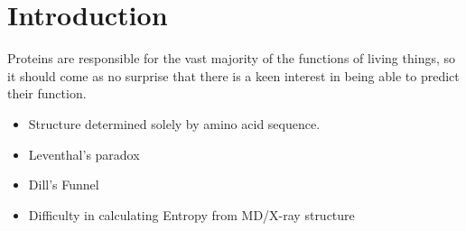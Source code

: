 \section*{Introduction}
\label{sec:introduction}
Proteins are responsible for the vast majority of the functions of living things, so it should come as no surprise that there is a keen interest in being able to predict their function\cite{Dill:2008p283}.
\begin{itemize}
	\item Structure determined solely by amino acid sequence.
	\item Leventhal's paradox
	\item Dill's Funnel
	\item Difficulty in calculating Entropy from MD/X-ray structure
\end{itemize}
